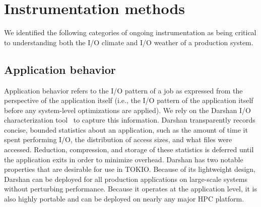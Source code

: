 \section{Instrumentation methods} \label{sec:methods}

We identified the following categories of ongoing instrumentation as being
critical to understanding both the I/O climate and I/O weather of a
production system.  

\subsection{Application behavior}
\label{sec:methods/darshan}

Application behavior refers to the I/O pattern of a job as expressed from
the perspective of the application itself (i.e., the I/O pattern of the
application itself before any system-level optimizations are applied).
We rely on the Darshan I/O characterization tool~\cite{carns200924}
to capture this information.  Darshan transparently records concise,
bounded statistics about an application, such as the amount of time it
spent performing I/O, the distribution of access sizes, and what files
were accessed.  Reduction, compression, and storage of these statistics
is deferred until the application exits in order to minimize overhead.
Darshan has two notable properties that are desirable for use in TOKIO.
Because of its lightweight design, Darshan can be deployed for all
production applications on large-scale systems without perturbing
performance.  Because it operates at the application level, it is also highly
portable and can be deployed on nearly any major HPC platform.

%

